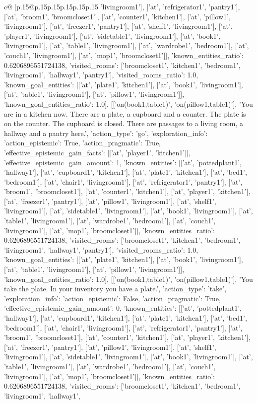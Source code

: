 \documentclass{article}
\begin{document}
{\begin{supertabular}{c@{$\;$}|p{.15\linewidth}@{}p{.15\linewidth}p{.15\linewidth}p{.15\linewidth}p{.15\linewidth}p{.15\linewidth}}
{{{'livingroom1'], ['at', 'refrigerator1', 'pantry1'], ['at', 'broom1', 'broomcloset1'], ['at', 'counter1', 'kitchen1'], ['at', 'pillow1', 'livingroom1'], ['at', 'freezer1', 'pantry1'], ['at', 'shelf1', 'livingroom1'], ['at', 'player1', 'livingroom1'], ['at', 'sidetable1', 'livingroom1'], ['at', 'book1', 'livingroom1'], ['at', 'table1', 'livingroom1'], ['at', 'wardrobe1', 'bedroom1'], ['at', 'couch1', 'livingroom1'], ['at', 'mop1', 'broomcloset1']], 'known_entities_ratio': 0.6206896551724138, 'visited_rooms': ['broomcloset1', 'kitchen1', 'bedroom1', 'livingroom1', 'hallway1', 'pantry1'], 'visited_rooms_ratio': 1.0, 'known_goal_entities': [['at', 'plate1', 'kitchen1'], ['at', 'book1', 'livingroom1'], ['at', 'table1', 'livingroom1'], ['at', 'pillow1', 'livingroom1']], 'known_goal_entities_ratio': 1.0}}], [['on(book1,table1)', 'on(pillow1,table1)'], 'You are in a kitchen now. There are a plate, a cupboard and a counter. The plate is on the counter. The cupboard is closed. There are passages to a living room, a hallway and a pantry here.', {'action_type': 'go', 'exploration_info': {'action_epistemic': True, 'action_pragmatic': True, 'effective_epistemic_gain_facts': [['at', 'player1', 'kitchen1']], 'effective_epistemic_gain_amount': 1, 'known_entities': [['at', 'pottedplant1', 'hallway1'], ['at', 'cupboard1', 'kitchen1'], ['at', 'plate1', 'kitchen1'], ['at', 'bed1', 'bedroom1'], ['at', 'chair1', 'livingroom1'], ['at', 'refrigerator1', 'pantry1'], ['at', 'broom1', 'broomcloset1'], ['at', 'counter1', 'kitchen1'], ['at', 'player1', 'kitchen1'], ['at', 'freezer1', 'pantry1'], ['at', 'pillow1', 'livingroom1'], ['at', 'shelf1', 'livingroom1'], ['at', 'sidetable1', 'livingroom1'], ['at', 'book1', 'livingroom1'], ['at', 'table1', 'livingroom1'], ['at', 'wardrobe1', 'bedroom1'], ['at', 'couch1', 'livingroom1'], ['at', 'mop1', 'broomcloset1']], 'known_entities_ratio': 0.6206896551724138, 'visited_rooms': ['broomcloset1', 'kitchen1', 'bedroom1', 'livingroom1', 'hallway1', 'pantry1'], 'visited_rooms_ratio': 1.0, 'known_goal_entities': [['at', 'plate1', 'kitchen1'], ['at', 'book1', 'livingroom1'], ['at', 'table1', 'livingroom1'], ['at', 'pillow1', 'livingroom1']], 'known_goal_entities_ratio': 1.0}}], [['on(book1,table1)', 'on(pillow1,table1)'], 'You take the plate. In your inventory you have a plate.', {'action_type': 'take', 'exploration_info': {'action_epistemic': False, 'action_pragmatic': True, 'effective_epistemic_gain_amount': 0, 'known_entities': [['at', 'pottedplant1', 'hallway1'], ['at', 'cupboard1', 'kitchen1'], ['at', 'plate1', 'kitchen1'], ['at', 'bed1', 'bedroom1'], ['at', 'chair1', 'livingroom1'], ['at', 'refrigerator1', 'pantry1'], ['at', 'broom1', 'broomcloset1'], ['at', 'counter1', 'kitchen1'], ['at', 'player1', 'kitchen1'], ['at', 'freezer1', 'pantry1'], ['at', 'pillow1', 'livingroom1'], ['at', 'shelf1', 'livingroom1'], ['at', 'sidetable1', 'livingroom1'], ['at', 'book1', 'livingroom1'], ['at', 'table1', 'livingroom1'], ['at', 'wardrobe1', 'bedroom1'], ['at', 'couch1', 'livingroom1'], ['at', 'mop1', 'broomcloset1']], 'known_entities_ratio': 0.6206896551724138, 'visited_rooms': ['broomcloset1', 'kitchen1', 'bedroom1', 'livingroom1', 'hallway1', }}}
\end{supertabular}}
\end{document}
